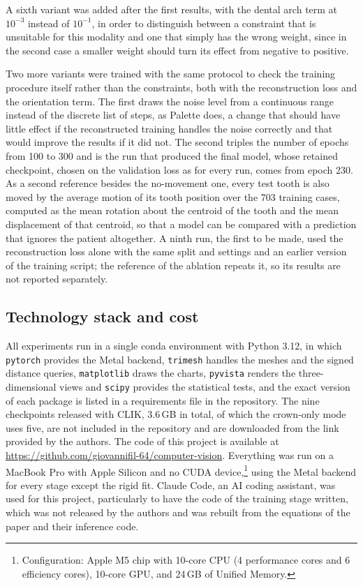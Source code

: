 \documentclass[10pt,a4paper]{article}
\begin{document}
A sixth variant was added after the first results, with the dental arch term at $10^{-3}$ instead of $10^{-1}$, in order to distinguish between a constraint that is unsuitable for this modality and one that simply has the wrong weight, since in the second case a smaller weight should turn its effect from negative to positive.

Two more variants were trained with the same protocol to check the training procedure itself rather than the constraints, both with the reconstruction loss and the orientation term. The first draws the noise level from a continuous range instead of the discrete list of steps, as Palette does, a change that should have little effect if the reconstructed training handles the noise correctly and that would improve the results if it did not. The second triples the number of epochs from 100 to 300 and is the run that produced the final model, whose retained checkpoint, chosen on the validation loss as for every run, comes from epoch 230. As a second reference besides the no-movement one, every test tooth is also moved by the average motion of its tooth position over the 703 training cases, computed as the mean rotation about the centroid of the tooth and the mean displacement of that centroid, so that a model can be compared with a prediction that ignores the patient altogether. A ninth run, the first to be made, used the reconstruction loss alone with the same split and settings and an earlier version of the training script; the reference of the ablation repeats it, so its results are not reported separately.

\subsection{Technology stack and cost}
\label{sec:stack}

All experiments run in a single conda environment with Python 3.12, in which \texttt{pytorch} provides the Metal backend, \texttt{trimesh} handles the meshes and the signed distance queries, \texttt{matplotlib} draws the charts, \texttt{pyvista} renders the three-dimensional views and \texttt{scipy} provides the statistical tests, and the exact version of each package is listed in a requirements file in the repository. The nine checkpoints released with CLIK, 3.6\,GB in total, of which the crown-only mode uses five, are not included in the repository and are downloaded from the link provided by the authors. The code of this project is available at \url{https://github.com/giovannifil-64/computer-vision}. Everything was run on a MacBook Pro with Apple Silicon and no CUDA device,\footnote{Configuration: Apple M5 chip with 10-core CPU (4 performance cores and 6 efficiency cores), 10-core GPU, and 24\,GB of Unified Memory.} using the Metal backend for every stage except the rigid fit. Claude Code, an AI coding assistant, was used for this project, particularly to have the code of the training stage written, which was not released by the authors and was rebuilt from the equations of the paper and their inference code.
\end{document}
